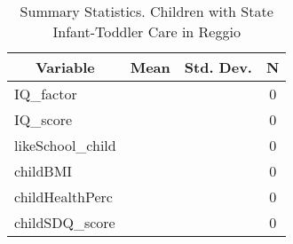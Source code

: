 
\begin{table}[htbp]\centering \caption{Summary Statistics. Children with State Infant-Toddler Care in Reggio \label{bothChildasiloStatReggio}}
\begin{tabular}{l c c  c}\hline\hline
\multicolumn{1}{c}{\textbf{Variable}} & \textbf{Mean}
 & \textbf{Std. Dev.} & \textbf{N}\\ \hline
IQ\_factor &  &   & 0\\
IQ\_score &  &   & 0\\
likeSchool\_child &  &   & 0\\
childBMI &  &   & 0\\
childHealthPerc &  &   & 0\\
childSDQ\_score &  &   & 0\\
\hline\end{tabular}
\end{table}

